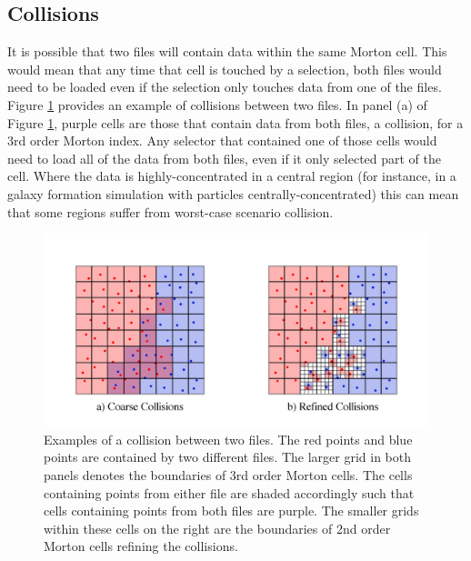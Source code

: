 \documentclass[apjl]{emulateapj}
\begin{document}
\subsection{Collisions}
It is possible that two files will contain data within the same Morton cell.  This would mean that any time that cell is touched by a selection, both files would need to be loaded even if the selection only touches data from one of the files. Figure \ref{fig:collision} provides an example of collisions between two files. In panel (a) of Figure \ref{fig:collision}, purple cells are those that contain data from both files, a collision, for a 3rd order Morton index. Any selector that contained one of those cells would need to load all of the data from both files, even if it only selected part of the cell.  Where the data is highly-concentrated in a central region (for instance, in a galaxy formation simulation with particles centrally-concentrated) this can mean that some regions suffer from worst-case scenario collision.
%
\ifinclfig
	\begin{figure}[htbp]
	\begin{center}
	\includegraphics[width=\columnwidth,keepaspectratio]{../images/collisions.png}
	\caption{Examples of a collision between two files. The red points and blue points are contained by two different files. The larger grid in both panels denotes the boundaries of 3rd order Morton cells.  The cells containing points from either file are shaded accordingly such that cells containing points from both files are purple. The smaller grids within these cells on the right are the boundaries of 2nd order Morton cells refining the collisions.}
	\label{fig:collision}
	\end{center}
	\end{figure}
\fi
%
\end{document}
